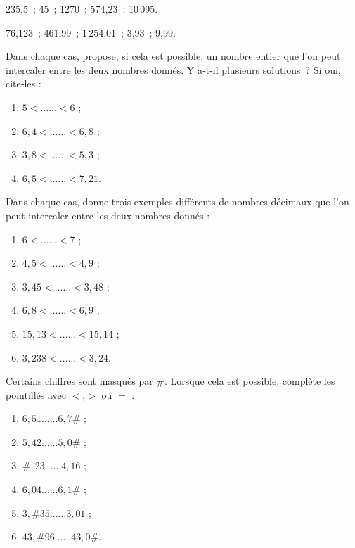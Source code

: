 


\vspace{6em}%




\begin{exercice}
235,5 ; 45 ; 1270 ; 574,23 ; 10\,095.
\end{exercice}


\begin{exercice}
76,123 ; 461,99 ; 1\,254,01 ; 3,93 ; 9,99.
\end{exercice}



\begin{exercice}
Dans chaque cas, propose, si cela est possible, un nombre entier que l'on peut intercaler entre les deux nombres donnés. 
Y a‑t‑il plusieurs solutions ? Si oui, cite‑les :
\begin{enumerate}
 \item $5 < …… < 6$ ;
 \item $6,4 < …… < 6,8$ ;
 \item $3,8 < …… < 5,3$ ;
 \item $6,5 < …… < 7,21$.
 \end{enumerate}
\end{exercice}


\begin{exercice}
Dans chaque cas, donne trois exemples différents de nombres décimaux que l'on peut intercaler entre les deux nombres donnés :
\begin{enumerate}
 \item $6 < …… < 7$ ;
 \item $4,5 < …… < 4,9$ ;
 \item $3,45 < …… < 3,48$ ;
 \item $6,8 < …… < 6,9$ ;
 \item $15,13 < …… < 15,14$ ;
 \item $3,238 < …… < 3,24$.
 \end{enumerate}
\end{exercice}


\begin{exercice}
Certains chiffres sont masqués par \#. Lorsque cela est possible, complète les pointillés avec $<$,$>$ ou $=$ :
\begin{enumerate} 
 \item $6,51 …… 6,7\#$ ;
 \item $5,42 …… 5,0\#$ ;
 \item $\#,23 …… 4,16$ ;
 \item $6,04 …… 6,1\#$ ;
 \item $3,\#35 …… 3,01$ ;
 \item $43,\#96 …… 43,0\#$.
 \end{enumerate}
\end{exercice}


